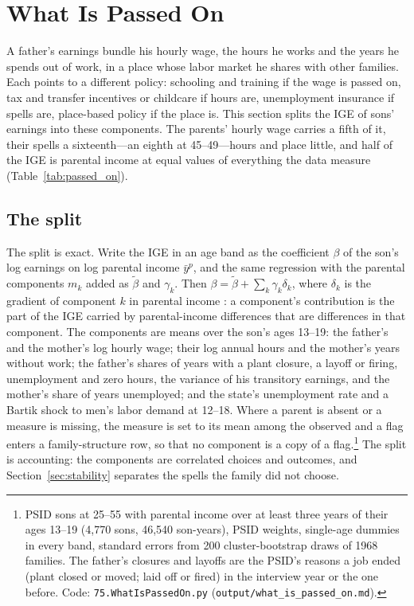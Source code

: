 \section{What Is Passed On}\label{sec:passedon}

A father's earnings bundle his hourly wage, the hours he works and the years he spends out of work, in a place whose
labor market he shares with other families. Each points to a different policy: schooling and training if the wage is
passed on, tax and transfer incentives or childcare if hours are, unemployment insurance if spells are, place-based
policy if the place is. This section splits the IGE of sons' earnings into these components. The parents' hourly wage
carries a fifth of it, their spells a sixteenth---an eighth at 45--49---hours and place little, and half of the IGE is
parental income at equal values of everything the data measure (Table~\ref{tab:passed_on}).

\subsection{The split}

The split is exact. Write the IGE in an age band as the coefficient $\beta$ of the son's log earnings on log parental
income $\bar y^p$, and the same regression with the parental components $m_k$ added as $\tilde\beta$ and $\gamma_k$.
Then $\beta = \tilde\beta + \sum_k \gamma_k \delta_k$, where $\delta_k$ is the gradient of component $k$ in parental
income \citep{gelbach2016covariates}: a component's contribution is the part of the IGE carried by parental-income
differences that are differences in that component. The components are means over the son's ages 13--19: the father's
and the mother's log hourly wage; their log annual hours and the mother's years without work; the father's shares of
years with a plant closure, a layoff or firing, unemployment and zero hours, the variance of his transitory earnings,
and the mother's share of years unemployed; and the state's unemployment rate and a Bartik shock to men's labor demand
at 12--18. Where a parent is absent or a measure is missing, the measure is set to its mean among the observed and a flag
enters a family-structure row, so that no component is a copy of a flag.\footnote{PSID sons at 25--55 with parental
income over at least three years of their ages 13--19 (4,770 sons, 46,540 son-years), PSID weights, single-age dummies
in every band, standard errors from 200 cluster-bootstrap draws of 1968 families. The father's closures and layoffs are
the PSID's reasons a job ended (plant closed or moved; laid off or fired) in the interview year or the one before. Code:
\texttt{75.WhatIsPassedOn.py} (\texttt{output/what\_is\_passed\_on.md}).} The split is accounting: the components are
correlated choices and outcomes, and Section~\ref{sec:stability} separates the spells the family did not choose.

